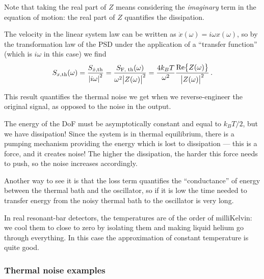 \documentclass[main.tex]{subfiles}
\begin{document}
Note that taking the real part of \(Z\) means considering the \emph{imaginary} term in the equation of motion: the real part of \(Z\) quantifies the dissipation. 


The velocity in the linear system law can be written as \(\dot{x}(\omega) = i \omega x(\omega )\), so by the transformation law of the PSD under the application of a ``transfer function'' (which is \(i \omega \) in this case) we find 
%
\begin{align}
S_{x, \text{th}} (\omega ) = \frac{S_{\dot{x}, \text{th}}}{\abs{i \omega }^2} 
= \frac{S _{\text{F, th}} (\omega )}{\omega^2 \abs{Z(\omega )}^2}
= \frac{4 k_B T}{\omega^2} \frac{\Re{Z(\omega )}}{\abs{Z(\omega )}^2} 
\,.
\end{align}

This result quantifies the thermal noise we get when we reverse-engineer the original signal, as opposed to the noise in the output.

The energy of the DoF must be asymptotically constant and equal to \(k_B T /2\), but we have dissipation! Since the system is in thermal equilibrium, there is a pumping mechanism providing the energy which is lost to dissipation --- this is a force, and it creates noise! 
The higher the dissipation, the harder this force needs to push, so the noise increases accordingly. 

Another way to see it is that the loss term quantifies the ``conductance'' of energy between the thermal bath and the oscillator, so if it is low the time needed to transfer energy from the noisy thermal bath to the oscillator is very long. 

In real resonant-bar detectors, the temperatures are of the order of milliKelvin: we cool them to close to zero by isolating them and making liquid helium go through everything. 
In this case the approximation of constant temperature is quite good.

\subsubsection{Thermal noise examples}
\end{document}
